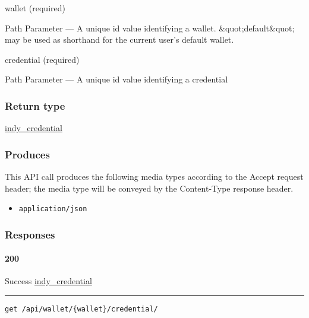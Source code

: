 wallet (required)

{Path Parameter} --- A unique id value identifying a wallet.
\&quot;default\&quot; may be used as shorthand for the current user's
default wallet.

credential (required)

{Path Parameter} --- A unique id value identifying a credential

\hypertarget{return-type-148}{%
\subsubsection{Return type}\label{return-type-148}}

\protect\hyperlink{indy_credential}{indy\_credential}

\hypertarget{produces-187}{%
\subsubsection{Produces}\label{produces-187}}

This API call produces the following media types according to the
{Accept} request header; the media type will be conveyed by the
{Content-Type} response header.

\begin{itemize}
\tightlist
\item
  \texttt{application/json}
\end{itemize}

\hypertarget{responses-193}{%
\subsubsection{Responses}\label{responses-193}}

\hypertarget{section-622}{%
\paragraph{200}\label{section-622}}

Success \protect\hyperlink{indy_credential}{indy\_credential}

\begin{center}\rule{0.5\linewidth}{\linethickness}\end{center}

\protect\hypertarget{apiWalletWalletCredentialGet}{}{}

\begin{verbatim}
get /api/wallet/{wallet}/credential/
\end{verbatim}

